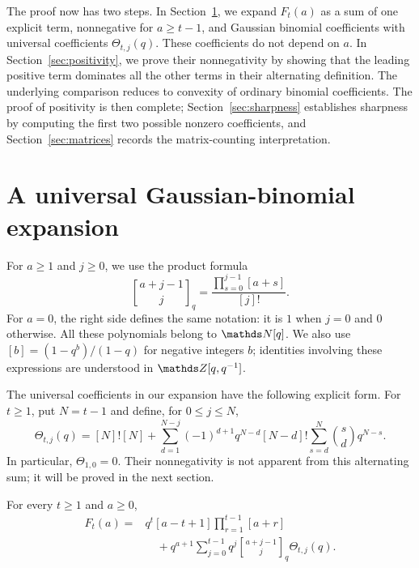 \documentclass[11pt]{amsart}
\newcommand{\qbinom}[2]{\genfrac{[}{]}{0pt}{}{#1}{#2}_{q}}
\begin{document}
The proof now has two steps. In Section~\ref{sec:expansion}, we expand
$F_t(a)$ as a sum of one explicit term, nonnegative for $a\ge t-1$,
and Gaussian binomial coefficients with universal coefficients
$\Theta_{t,j}(q)$. These coefficients do not depend on $a$.
In Section~\ref{sec:positivity}, we prove their nonnegativity by showing
that the leading positive term dominates all the other terms in their
alternating definition. The underlying comparison reduces to convexity
of ordinary binomial coefficients. The proof of positivity is then
complete; Section~\ref{sec:sharpness} establishes sharpness by computing
the first two possible nonzero coefficients, and
Section~\ref{sec:matrices} records the matrix-counting interpretation.

\section{A universal Gaussian-binomial expansion}\label{sec:expansion}

For $a\ge1$ and $j\ge0$, we use the product formula
\[
 \qbinom{a+j-1}{j}
 =\frac{\prod_{s=0}^{j-1}[a+s]}{[j]!}.
\]
For $a=0$, the right side defines the same notation: it is $1$ when
$j=0$ and $0$ otherwise. All these polynomials belong to $\N[q]$.
We also use $[b]=(1-q^b)/(1-q)$ for negative integers $b$; identities
involving these expressions are understood in $\Z[q,q^{-1}]$.

The universal coefficients in our expansion have the following explicit
form. For $t\ge1$, put $N=t-1$ and define, for $0\le j\le N$,
\begin{equation}\label{eq:Theta}
 \Theta_{t,j}(q)
 =[N]![N]+\sum_{d=1}^{N-j}(-1)^{d+1}q^{N-d}[N-d]!
       \sum_{s=d}^{N}\binom{s}{d}q^{N-s}.
\end{equation}
In particular, $\Theta_{1,0}=0$. Their nonnegativity is not apparent
from this alternating sum; it will be proved in the next section.

\begin{proposition}\label{prop:decomposition}
For every $t\ge1$ and $a\ge0$,
\begin{equation}\label{eq:positive-decomposition}
\begin{split}
 F_t(a)={}&q^t[a-t+1]\prod_{r=1}^{t-1}[a+r]\\
 &\quad+q^{a+1}\sum_{j=0}^{t-1}q^j
       \qbinom{a+j-1}{j}\Theta_{t,j}(q).
\end{split}
\end{equation}
\end{proposition}
\end{document}
